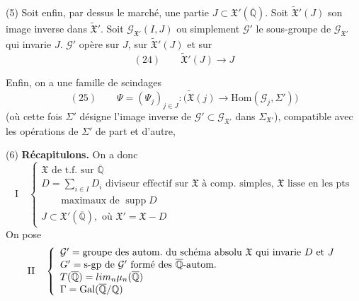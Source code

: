\documentclass[11pt,a4paper]{article}
\begin{document}
(5) Soit enfin, par dessus le marché, une partie
$J \subset \mathfrak{X}'(\overline{\mathbb{Q}})$. Soit
$\widetilde{\mathfrak{X}}'(J)$ son image inverse dans
$\widetilde{\mathfrak{X}}'$. Soit $\mathcal{G}_{\mathfrak{X}'}(I,J)$ ou
simplement $\mathcal{G}'$ le sous-groupe de $\mathcal{G}_{\mathfrak{X}'}$ qui
invarie $J$.  $\mathcal{G}'$ opère sur $J$, sur
$\widetilde{\mathfrak{X}}'(J)$ et sur
\[
  (24)\qquad \widetilde{\mathfrak{X}}'(J) \longrightarrow J
\]

Enfin, on a une famille de scindages 
\[
  (25)\qquad \Psi = (\Psi_j)_{j \in J} : \bigl(\widetilde{\mathfrak{X}}(j)
  \longrightarrow \mathrm{Hom}(\mathcal{G}_j, \Sigma')\bigr)
\]
(où cette fois $\Sigma'$ désigne l'image inverse
 de $\mathcal{G}' \subset \mathcal{G}_{\mathfrak{X}'}$ dans
$\Sigma_{\mathfrak{X}'}$), compatible avec les opérations de
$\Sigma'$ de part et d'autre,  \struck{\ill{}}
   \struck{\ill{}}
 
 

(6) \textbf{Récapitulons.} On a donc 
\[
  \mathrm{I}\quad \left\{
  \begin{array}{l}
    \mathfrak{X} \text{ de t.f.\ sur } \overline{\mathbb{Q}} \\
    D = \sum_{i \in I} D_i \text{ diviseur effectif sur } \mathfrak{X}
      \text{ à comp.\ simples, } \mathfrak{X} \text{ lisse en les pts} \\
    \qquad \text{maximaux de } \operatorname{supp} D \\
    J \subset \mathfrak{X}'(\overline{\mathbb{Q}}), \text{ où }
      \mathfrak{X}' = \mathfrak{X} - D
  \end{array}\right.
\]
On pose
\[
  \mathrm{II}\quad \left\{
  \begin{array}{l}
    \mathcal{G}' = \text{groupe des autom.\ du schéma absolu } \mathfrak{X}
      \text{ qui invarie } D \text{ et } J \\
    G' = \text{s-gp de } \mathcal{G}' \text{ formé des }
      \overline{\mathbb{Q}}\text{-autom.} \\
    T(\overline{\mathbb{Q}}) = \varprojlim_n \mu_n(\overline{\mathbb{Q}}) \\
    \Gamma = \mathrm{Gal}(\overline{\mathbb{Q}}/\mathbb{Q})
  \end{array}\right.
\]
\end{document}
